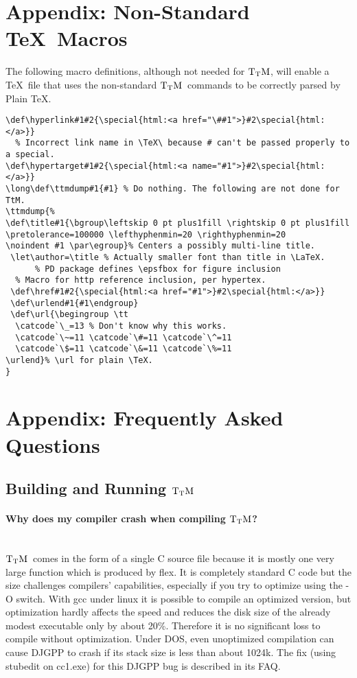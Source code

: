 \documentclass[12pt]{article}
\def\ttmdump{}
\def\TtM{$\rm{}T_TH$}
\def\TtM{$\rm{}T_TM$}%
\begin{document}
\appendix
\section{Appendix: Non-Standard \TeX\ Macros}

The following macro definitions, although not needed for \TtM, will
enable a \TeX\ file that uses the non-standard \TtM\ commands to be
correctly parsed by Plain \TeX.

{\begin{verbatim}
\def\hyperlink#1#2{\special{html:<a href="\##1">}#2\special{html:</a>}}
  % Incorrect link name in \TeX\ because # can't be passed properly to a special.
\def\hypertarget#1#2{\special{html:<a name="#1">}#2\special{html:</a>}}
\long\def\ttmdump#1{#1} % Do nothing. The following are not done for TtM.
\ttmdump{%
\def\title#1{\bgroup\leftskip 0 pt plus1fill \rightskip 0 pt plus1fill
\pretolerance=100000 \lefthyphenmin=20 \righthyphenmin=20
\noindent #1 \par\egroup}% Centers a possibly multi-line title.
 \let\author=\title % Actually smaller font than title in \LaTeX.
      % PD package defines \epsfbox for figure inclusion
  % Macro for http reference inclusion, per hypertex.
 \def\href#1#2{\special{html:<a href="#1">}#2\special{html:</a>}}
 \def\urlend#1{#1\endgroup}
 \def\url{\begingroup \tt 
  \catcode`\_=13 % Don't know why this works.
  \catcode`\~=11 \catcode`\#=11 \catcode`\^=11 
  \catcode`\$=11 \catcode`\&=11 \catcode`\%=11
\urlend}% \url for plain \TeX.
}
\end{verbatim} }


\section{Appendix: Frequently Asked Questions}
\label{FAQ}

\subsection{Building and Running \TtM}

\paragraph{Why does my compiler crash when compiling \TtM?}
\leavevmode\\ \TtM\ comes in the form of a single C source file
because it is mostly one very large function which is produced by
flex. It is completely standard C code but the size challenges
compilers' capabilities, especially if you try to optimize using the
-O switch. With gcc under linux it is possible to compile an optimized
version, but optimization hardly affects the speed and reduces the
disk size of the already modest executable only by about
20\%. Therefore it is no significant loss to compile without
optimization. Under DOS, even unoptimized compilation can cause DJGPP
to crash if its stack size is less than about 1024k. The fix (using
stubedit on cc1.exe) for this DJGPP bug is described in its FAQ.
\end{document}
